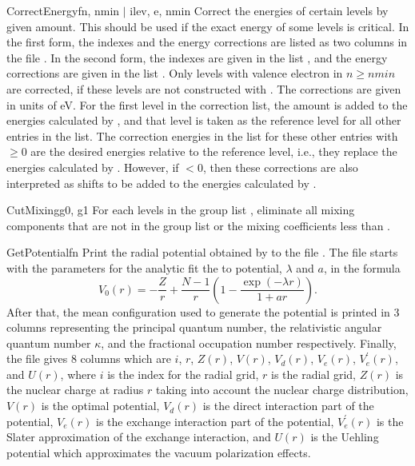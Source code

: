 \begin{fundesc}{CorrectEnergy}{fn, nmin $\mid$ ilev, e, nmin}
Correct the energies of certain levels by given amount. This should be used if
the exact energy of some levels is critical. In the first form, the indexes and
the energy corrections are listed as two columns in the file . In the
second form, the indexes are given in the list , and the energy
corrections are given in the list . Only levels with valence electron in
$n\ge nmin$ are corrected, if these levels are not constructed with
. The corrections are given in units of eV. For the first
level in the correction list, the amount is added to the energies calculated by
\cFAC, and that level is taken as the reference level for all other entries in
the list. The correction energies in the list  for these other entries
with $\ge 0$ are the desired energies relative to the reference level,
i.e., they replace the energies calculated by \cFAC. However, if $<0$,
then these corrections are also interpreted as shifts to be added to the
energies calculated by \cFAC.
\end{fundesc}

\begin{fundesc}{CutMixing}{g0, g1}
For each levels in the group list , eliminate all mixing components
that are not in the group list  or the mixing coefficients less than
.
\end{fundesc}

\begin{fundesc}{GetPotential}{fn}
Print the radial potential obtained by  to the file
. The file starts with the parameters for the analytic fit the to
potential, $\lambda$ and $a$, in the formula
\begin{equation}
V_0(r) = -\frac{Z}{r} + \frac{N-1}{r}\left(1-\frac{\exp(-\lambda
r)}{1+ar}\right). 
\end{equation}
After that, the mean configuration used to generate the potential is printed
in 3 columns representing the principal quantum number, the relativistic
angular quantum number $\kappa$, and the fractional occupation number
respectively. Finally, the file gives 8 columns which are $i$, $r$, $Z(r)$,
$V(r)$, $V_d(r)$, $V_e(r)$, $V_e^\prime(r)$, and $U(r)$, where $i$ is the index
for the radial grid, $r$ is the radial grid, $Z(r)$ is the nuclear charge at
radius $r$ taking into account the nuclear charge distribution, $V(r)$ is the
optimal potential, $V_d(r)$ is the direct interaction part of the potential,
$V_e(r)$ is the exchange interaction part of the potential, $V_e^\prime(r)$ is
the Slater approximation of the exchange interaction, and $U(r)$ is the
Uehling potential which approximates the vacuum polarization effects.
\end{fundesc}

